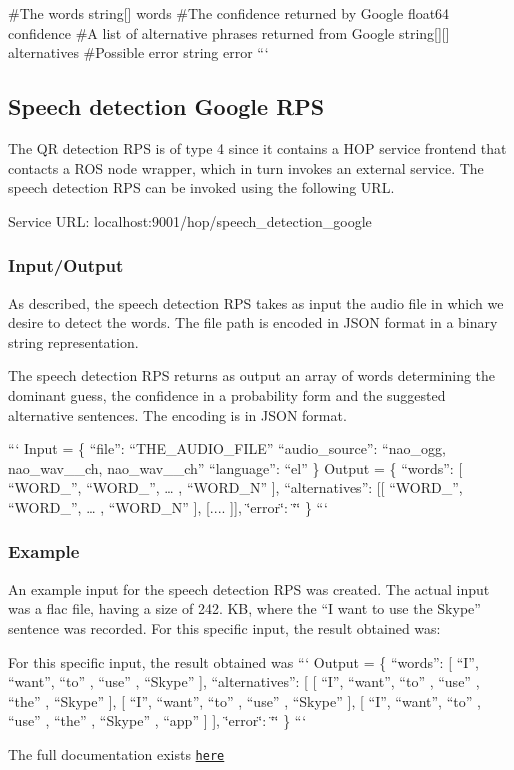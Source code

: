 \#\-The words string\mbox{[}\mbox{]} words \#\-The confidence returned by Google float64 confidence \#\-A list of alternative phrases returned from Google string\mbox{[}\mbox{]}\mbox{[}\mbox{]} alternatives \#\-Possible error string error ``` \subsection*{Speech detection Google R\-P\-S}

The Q\-R detection R\-P\-S is of type 4 since it contains a H\-O\-P service frontend that contacts a R\-O\-S node wrapper, which in turn invokes an external service. The speech detection R\-P\-S can be invoked using the following U\-R\-L.

Service U\-R\-L\-: {\ttfamily localhost\-:9001/hop/speech\-\_\-detection\-\_\-google}

\subsubsection*{Input/\-Output}

As described, the speech detection R\-P\-S takes as input the audio file in which we desire to detect the words. The file path is encoded in J\-S\-O\-N format in a binary string representation.

The speech detection R\-P\-S returns as output an array of words determining the dominant guess, the confidence in a probability form and the suggested alternative sentences. The encoding is in J\-S\-O\-N format.

``` Input = \{ “file”\-: “\-T\-H\-E\-\_\-\-A\-U\-D\-I\-O\-\_\-\-F\-I\-L\-E” “audio\-\_\-source”\-: “nao\-\_\-ogg, nao\-\_\-wav\-\_\-\_\-ch, nao\-\_\-wav\-\_\-\_\-ch” “language”\-: “el” \} {\ttfamily  } Output = \{ “words”\-: \mbox{[} “\-W\-O\-R\-D\-\_”, “\-W\-O\-R\-D\-\_”, … , “\-W\-O\-R\-D\-\_\-\-N” \mbox{]}, “alternatives”\-: \mbox{[}\mbox{[} “\-W\-O\-R\-D\-\_”, “\-W\-O\-R\-D\-\_”, … , “\-W\-O\-R\-D\-\_\-\-N” \mbox{]}, \mbox{[}.... \mbox{]}\mbox{]}, \char`\"{}error\char`\"{}\-: \char`\"{}\char`\"{} \} ``` \subsubsection*{Example}

An example input for the speech detection R\-P\-S was created. The actual input was a flac file, having a size of 242. K\-B, where the “\-I want to use the Skype” sentence was recorded. For this specific input, the result obtained was\-:

For this specific input, the result obtained was ``` Output = \{ “words”\-: \mbox{[} “\-I”, “want”, “to” , “use” , “\-Skype” \mbox{]}, “alternatives”\-: \mbox{[} \mbox{[} “\-I”, “want”, “to” , “use” , “the” , “\-Skype” \mbox{]}, \mbox{[} “\-I”, “want”, “to” , “use” , “\-Skype” \mbox{]}, \mbox{[} “\-I”, “want”, “to” , “use” , “the” , “\-Skype” , “app” \mbox{]} \mbox{]}, \char`\"{}error\char`\"{}\-: \char`\"{}\char`\"{} \} ```

The full documentation exists \href{https://github.com/rapp-project/rapp-platform/tree/master/rapp_web_services/services#speech-detection-google}{\tt here} 